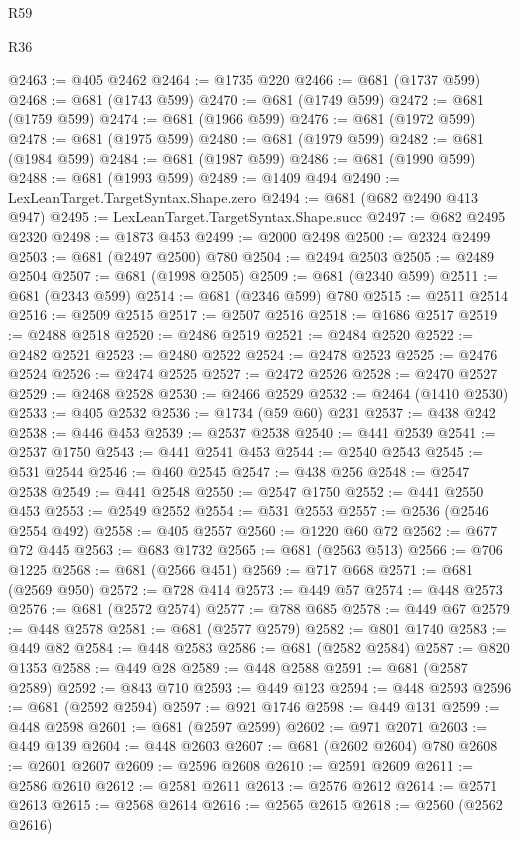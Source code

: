 \begin{lexlean}{R59}
\begin{lexlean}{R36}
\begin{coremodule}
{{{{{{{{{{{{{{{{{{{{{{{{{{{{{{{{{{{{{{{{{{{{{{{{{{{{{{{{{{{{{{{{{{{{{{{{{{{{{{{{{{@2463 := @405 @2462
@2464 := @1735 @220
@2466 := @681 (@1737 @599)
@2468 := @681 (@1743 @599)
@2470 := @681 (@1749 @599)
@2472 := @681 (@1759 @599)
@2474 := @681 (@1966 @599)
@2476 := @681 (@1972 @599)
@2478 := @681 (@1975 @599)
@2480 := @681 (@1979 @599)
@2482 := @681 (@1984 @599)
@2484 := @681 (@1987 @599)
@2486 := @681 (@1990 @599)
@2488 := @681 (@1993 @599)
@2489 := @1409 @494
@2490 := LexLeanTarget.TargetSyntax.Shape.zero
@2494 := @681 (@682 @2490 @413 @947)
@2495 := LexLeanTarget.TargetSyntax.Shape.succ
@2497 := @682 @2495 @2320
@2498 := @1873 @453
@2499 := @2000 @2498
@2500 := @2324 @2499
@2503 := @681 (@2497 @2500) @780
@2504 := @2494 @2503
@2505 := @2489 @2504
@2507 := @681 (@1998 @2505)
@2509 := @681 (@2340 @599)
@2511 := @681 (@2343 @599)
@2514 := @681 (@2346 @599) @780
@2515 := @2511 @2514
@2516 := @2509 @2515
@2517 := @2507 @2516
@2518 := @1686 @2517
@2519 := @2488 @2518
@2520 := @2486 @2519
@2521 := @2484 @2520
@2522 := @2482 @2521
@2523 := @2480 @2522
@2524 := @2478 @2523
@2525 := @2476 @2524
@2526 := @2474 @2525
@2527 := @2472 @2526
@2528 := @2470 @2527
@2529 := @2468 @2528
@2530 := @2466 @2529
@2532 := @2464 (@1410 @2530)
@2533 := @405 @2532
@2536 := @1734 (@59 @60) @231
@2537 := @438 @242
@2538 := @446 @453
@2539 := @2537 @2538
@2540 := @441 @2539
@2541 := @2537 @1750
@2543 := @441 @2541 @453
@2544 := @2540 @2543
@2545 := @531 @2544
@2546 := @460 @2545
@2547 := @438 @256
@2548 := @2547 @2538
@2549 := @441 @2548
@2550 := @2547 @1750
@2552 := @441 @2550 @453
@2553 := @2549 @2552
@2554 := @531 @2553
@2557 := @2536 (@2546 @2554 @492)
@2558 := @405 @2557
@2560 := @1220 @60 @72
@2562 := @677 @72 @445
@2563 := @683 @1732
@2565 := @681 (@2563 @513)
@2566 := @706 @1225
@2568 := @681 (@2566 @451)
@2569 := @717 @668
@2571 := @681 (@2569 @950)
@2572 := @728 @414
@2573 := @449 @57
@2574 := @448 @2573
@2576 := @681 (@2572 @2574)
@2577 := @788 @685
@2578 := @449 @67
@2579 := @448 @2578
@2581 := @681 (@2577 @2579)
@2582 := @801 @1740
@2583 := @449 @82
@2584 := @448 @2583
@2586 := @681 (@2582 @2584)
@2587 := @820 @1353
@2588 := @449 @28
@2589 := @448 @2588
@2591 := @681 (@2587 @2589)
@2592 := @843 @710
@2593 := @449 @123
@2594 := @448 @2593
@2596 := @681 (@2592 @2594)
@2597 := @921 @1746
@2598 := @449 @131
@2599 := @448 @2598
@2601 := @681 (@2597 @2599)
@2602 := @971 @2071
@2603 := @449 @139
@2604 := @448 @2603
@2607 := @681 (@2602 @2604) @780
@2608 := @2601 @2607
@2609 := @2596 @2608
@2610 := @2591 @2609
@2611 := @2586 @2610
@2612 := @2581 @2611
@2613 := @2576 @2612
@2614 := @2571 @2613
@2615 := @2568 @2614
@2616 := @2565 @2615
@2618 := @2560 (@2562 @2616)
}}}}}}}}}}}}}}}}}}}}}}}}}}}}}}}}}}}}}}}}}}}}}}}}}}}}}}}}}}}}}}}}}}}}}}}}}}}}}}}}}}
\end{coremodule}
\end{lexlean}
\end{lexlean}
